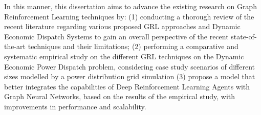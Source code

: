 In this manner, this dissertation aims to advance the existing research on Graph Reinforcement Learning techniques by: (1) conducting a thorough review of the recent literature regarding various proposed GRL approaches and Dynamic Economic Dispatch Systems to gain an overall perspective of the recent state-of-the-art techniques and their limitations; (2) performing a comparative and systematic empirical study on the different GRL techniques on the Dynamic Economic Power Dispatch problem, considering case study scenarios of different sizes modelled by a power distribution grid simulation (3)  propose a model that better integrates the capabilities of Deep Reinforcement Learning Agents with Graph Neural Networks, based on the results of the empirical study, with improvements in performance and scalability. \\ \\

